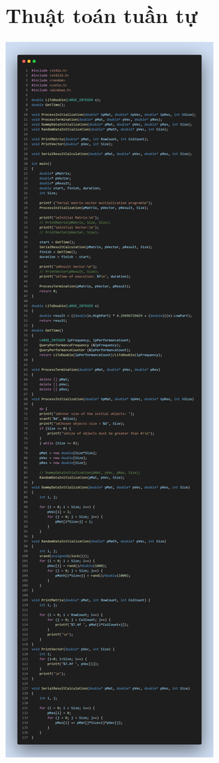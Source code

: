 \documentclass[12pt,a4paper]{report}
\begin{document}
\section{Thuật toán tuần tự}
\begin{center}
    \includegraphics[trim=0in 52in 0in 0in, clip, scale=0.25]{./Photos/MatMul/serial.PNG}\clearpage

\end{center}
\end{document}
